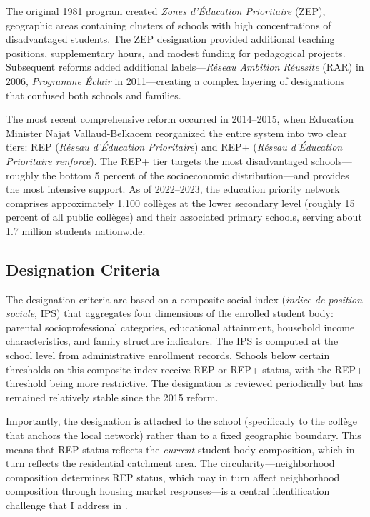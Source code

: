 \documentclass[12pt]{article}
\begin{document}
The original 1981 program created \textit{Zones d'\'{E}ducation Prioritaire} (ZEP), geographic areas containing clusters of schools with high concentrations of disadvantaged students. The ZEP designation provided additional teaching positions, supplementary hours, and modest funding for pedagogical projects. Subsequent reforms added additional labels---\textit{R\'{e}seau Ambition R\'{e}ussite} (RAR) in 2006, \textit{Programme \'{E}clair} in 2011---creating a complex layering of designations that confused both schools and families.

The most recent comprehensive reform occurred in 2014--2015, when Education Minister Najat Vallaud-Belkacem reorganized the entire system into two clear tiers: REP (\textit{R\'{e}seau d'\'{E}ducation Prioritaire}) and REP+ (\textit{R\'{e}seau d'\'{E}ducation Prioritaire renforc\'{e}}). The REP+ tier targets the most disadvantaged schools---roughly the bottom 5 percent of the socioeconomic distribution---and provides the most intensive support. As of 2022--2023, the education priority network comprises approximately 1,100 coll\`{e}ges at the lower secondary level (roughly 15 percent of all public coll\`{e}ges) and their associated primary schools, serving about 1.7 million students nationwide.

\subsection{Designation Criteria}

The designation criteria are based on a composite social index (\textit{indice de position sociale}, IPS) that aggregates four dimensions of the enrolled student body: parental socioprofessional categories, educational attainment, household income characteristics, and family structure indicators. The IPS is computed at the school level from administrative enrollment records. Schools below certain thresholds on this composite index receive REP or REP+ status, with the REP+ threshold being more restrictive. The designation is reviewed periodically but has remained relatively stable since the 2015 reform.

Importantly, the designation is attached to the school (specifically to the coll\`{e}ge that anchors the local network) rather than to a fixed geographic boundary. This means that REP status reflects the \textit{current} student body composition, which in turn reflects the residential catchment area. The circularity---neighborhood composition determines REP status, which may in turn affect neighborhood composition through housing market responses---is a central identification challenge that I address in .
\end{document}
